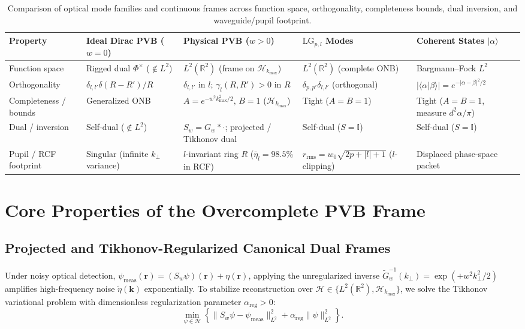 \documentclass[aps,pra,reprint,amsmath,amssymb,floatfix,longbibliography]{revtex4-2}
\providecommand{\ket}[1]{\lvert#1\rangle}
\providecommand{\braket}[2]{\langle#1\vert#2\rangle}
\providecommand{\abs}[1]{\lvert#1\rvert}
\providecommand{\norm}[1]{\lVert#1\rVert}
\begin{document}
\begin{table}[t]
\caption{Comparison of optical mode families and continuous frames across function space, orthogonality, completeness bounds, dual inversion, and waveguide/pupil footprint.}
\label{tab:frame_comparison}
\begin{ruledtabular}
\footnotesize
\begin{tabular}{p{2.3cm}p{3.2cm}p{4.3cm}p{3.4cm}p{3.4cm}}
Property & Ideal Dirac PVB ($w=0$) & Physical PVB ($w>0$) & $\mathrm{LG}_{p,l}$ Modes & Coherent States $\ket{\alpha}$ \\
\hline
Function space & Rigged dual $\Phi^\times$ ($\notin L^2$) & $L^2(\mathbb{R}^2)$ (frame on $\mathcal{H}_{k_{\max}}$) & $L^2(\mathbb{R}^2)$ (complete ONB) & Bargmann--Fock $L^2$ \\
Orthogonality & $\delta_{l,l'}\delta(R-R')/R$ & $\delta_{l,l'}$ in $l$; $\gamma_l(R,R')>0$ in $R$ & $\delta_{p,p'}\delta_{l,l'}$ (orthogonal) & $\abs{\braket{\alpha}{\beta}} = e^{-\abs{\alpha-\beta}^2/2}$ \\
Completeness / bounds & Generalized ONB & $A = e^{-w^2 k_{\max}^2/2},\, B=1$ ($\mathcal{H}_{k_{\max}}$) & Tight ($A=B=1$) & Tight ($A=B=1$, measure $d^2\alpha/\pi$) \\
Dual / inversion & Self-dual ($\notin L^2$) & $S_w = G_w * \cdot$; projected / Tikhonov dual & Self-dual ($S=\mathbb{I}$) & Self-dual ($S=\mathbb{I}$) \\
Pupil / RCF footprint & Singular (infinite $k_\perp$ variance) & $l$-invariant ring $R$ ($\bar{\eta}_l = 98.5\%$ in RCF) & $r_{\mathrm{rms}} = w_0\sqrt{2p+\abs{l}+1}$ ($l$-clipping) & Displaced phase-space packet \\
\end{tabular}
\end{ruledtabular}
\end{table}

\section{Core Properties of the Overcomplete PVB Frame}
\label{sec:properties}

\subsection{Projected and Tikhonov-Regularized Canonical Dual Frames}
\label{subsec:tikhonov_dual}

Under noisy optical detection, $\psi_{\mathrm{meas}}(\mathbf{r}) = (S_w\psi)(\mathbf{r}) + \eta(\mathbf{r})$, applying the unregularized inverse $\widetilde{G}_w^{-1}(k_\perp) = \exp(+w^2 k_\perp^2/2)$ amplifies high-frequency noise $\widetilde{\eta}(\mathbf{k})$ exponentially. To stabilize reconstruction over $\mathcal{H} \in \{L^2(\mathbb{R}^2), \mathcal{H}_{k_{\max}}\}$, we solve the Tikhonov variational problem with dimensionless regularization parameter $\alpha_{\mathrm{reg}} > 0$:
\begin{equation}
\min_{\psi \in \mathcal{H}} \left\{ \norm{S_w\psi - \psi_{\mathrm{meas}}}_{L^2}^2 + \alpha_{\mathrm{reg}}\norm{\psi}_{L^2}^2 \right\}.
\label{eq:tikhonov_opt}
\end{equation}
\end{document}
